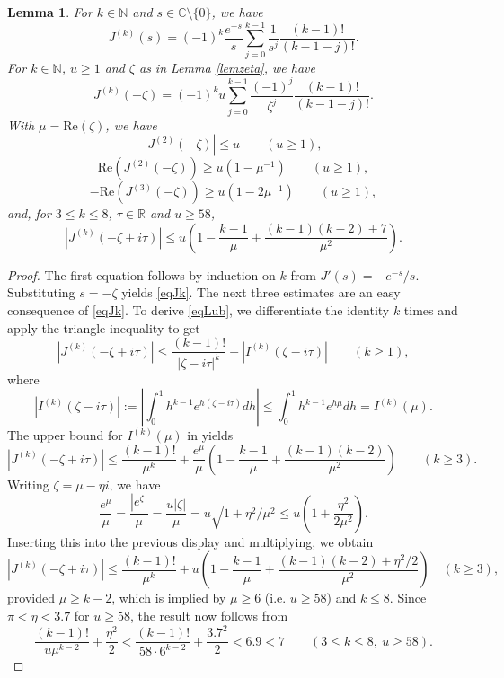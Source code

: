 \documentclass[11pt]{amsart}
\newtheorem{lemma}{Lemma}
\begin{document}
\begin{lemma}\label{lemJk}
For $k \in \mathbb{N}$ and $s\in \mathbb{C}\setminus \{0\}$, we have 
$$
J^{(k)}(s) = (-1)^{k} \frac{e^{-s}}{s} \sum_{j=0}^{k-1} \frac{1}{s^j} \frac{(k-1)!}{(k-1-j)!}.
$$
For $k \in \mathbb{N}$, $u\ge 1$ and $\zeta$ as in Lemma \ref{lemzeta}, we have
\begin{equation}\label{eqJk}
J^{(k)}(-\zeta) = (-1)^{k} u \sum_{j=0}^{k-1} \frac{(-1)^j}{\zeta^j} \frac{(k-1)!}{(k-1-j)!}.
\end{equation}
With $\mu=\mathrm{Re}(\zeta)$, we have
$$
|J^{(2)}(-\zeta)| \le u \qquad (u\ge 1),
$$
$$
\mathrm{Re}(J^{(2)}(-\zeta)) \ge u (1-\mu^{-1}) \qquad (u\ge 1),
$$
$$
-\mathrm{Re}(J^{(3)}(-\zeta)) \ge u (1-2\mu^{-1}) \qquad (u\ge 1),
$$
and, for $3\le k \le 8$, $\tau \in \mathbb{R}$ and $u\ge 58$, 
\begin{equation}\label{eqLub}
|J^{(k)}(-\zeta+i\tau)| \le  u \left(1-\frac{k-1}{\mu}+\frac{(k-1)(k-2)+7}{\mu^2}\right).
\end{equation}
\end{lemma}
\begin{proof}
The first equation follows by induction on $k$ from $J'(s)=-e^{-s}/s$. 
Substituting $s=-\zeta$ yields \eqref{eqJk}.
The next three estimates are an easy consequence of \eqref{eqJk}.
To derive \eqref{eqLub}, we differentiate the identity \cite[Eq.~(III.5.44)]{Ten} $k$ times
and apply the triangle inequality to get
$$
|J^{(k)}(-\zeta+i\tau)| \le  \frac{(k-1)!}{|\zeta-i\tau|^k} + |I^{(k)}(\zeta-i\tau)| \qquad (k\ge 1),
$$
where
$$
|I^{(k)}(\zeta-i\tau)| := |\int_0^1 h^{k-1} e^{h(\zeta-i\tau)} dh |\le \int_0^1 h^{k-1} e^{h \mu} dh
=I^{(k)}(\mu).
$$
The upper bound for $I^{(k)}(\mu)$ in \cite[Lemma 1]{Wein} yields
$$
|J^{(k)}(-\zeta+i\tau)| \le  \frac{(k-1)!}{\mu^k} +\frac{e^\mu}{\mu}\left(1-\frac{k-1}{\mu}+\frac{(k-1)(k-2)}{\mu^2}\right) \qquad (k\ge 3).
$$
Writing $\zeta=\mu-\eta i$, we have
$$ \frac{e^\mu}{\mu} =\frac{|e^\zeta|}{\mu}=\frac{ u|\zeta|}{\mu}=u \sqrt{1+\eta^2/\mu^2}\le u \left(1+\frac{\eta^2}{2\mu^2}\right).$$
Inserting this into the previous display and multiplying, we obtain
$$
|J^{(k)}(-\zeta+i\tau)| \le  \frac{(k-1)!}{\mu^k} +u\left(1-\frac{k-1}{\mu}+\frac{(k-1)(k-2)+\eta^2/2}{\mu^2}\right) \quad (k\ge 3),
$$
provided $\mu \ge k-2$, which is implied by $\mu\ge 6$ (i.e. $u\ge 58$) and $k\le 8$. 
Since $\pi <\eta<3.7$ for $u\ge 58$, the result now follows from
$$
 \frac{(k-1)!}{u\mu^{k-2}}+\frac{\eta^2}{2}
< \frac{(k-1)!}{58 \cdot 6^{k-2}}+\frac{3.7^2}{2}
<6.9
< 7 \qquad (3\le k \le 8,\ u\ge 58).
$$
\end{proof}
\end{document}
